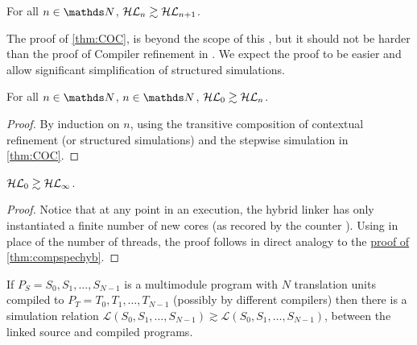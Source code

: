 \begin{conjecture}\label{thm:COC} For all  $n\in \nat$,  $\mathcal{HL}_{n} \gtrsim \mathcal{HL}_{n+1}$. \end{conjecture}

The proof of \cref{thm:COC}, is beyond the scope of this , but it should not be harder than the proof of Compiler refinement in \cite{compcomp}. We expect the proof to be easier and allow significant simplification of structured simulations. 

\begin{lemma}\label{thm:manycores} For all  $n\in \nat$,  $n\in \nat$,  $\mathcal{HL}_{0} \gtrsim \mathcal{HL}_{n}$.\end{lemma}
\begin{proof} By induction on $n$, using the transitive composition of contextual refinement (or structured simulations) and the stepwise simulation in \cref{thm:COC}.
\end{proof}


\begin{theorem}\label{thm:allcores} $\mathcal{HL}_{0} \gtrsim \mathcal{HL}_{\infty}$. \end{theorem}
\begin{proof} Notice that at any point in an execution, the hybrid linker has only instantiated a finite number of new cores (as recored by the counter ). Using  in place of the number of threads, the proof follows in direct analogy to the \hyperlink{proof:compspechyb}{proof of \cref*{thm:compspechyb}}.
\end{proof}

\begin{corollary}\label{thm:sepcomp} 
If $P_S = S_0, S_1, \dots , S_{N-1}$ is a multimodule program with $N$ translation units compiled to $P_T = T_0, T_1, \dots , T_{N-1}$ 
(possibly by different compilers) then there is a simulation relation $ \mathcal{L} (S_0, S_1, \dots , S_{N-1}) \gtrsim \mathcal{L} (S_0, S_1, \dots , S_{N-1})$, between the linked source and compiled programs. \end{corollary}

